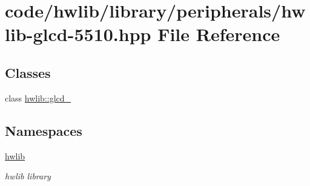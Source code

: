 \hypertarget{hwlib-glcd-5510_8hpp}{}\section{code/hwlib/library/peripherals/hwlib-\/glcd-\/5510.hpp File Reference}
\label{hwlib-glcd-5510_8hpp}
\subsection*{Classes}
\begin{DoxyCompactItemize}
\item 
class \hyperlink{classhwlib_1_1glcd__5510}{hwlib\+::glcd\+\_}
\end{DoxyCompactItemize}
\subsection*{Namespaces}
\begin{DoxyCompactItemize}
\item 
 \hyperlink{namespacehwlib}{hwlib}
\begin{DoxyCompactList}\small\item\em hwlib library \end{DoxyCompactList}\end{DoxyCompactItemize}
